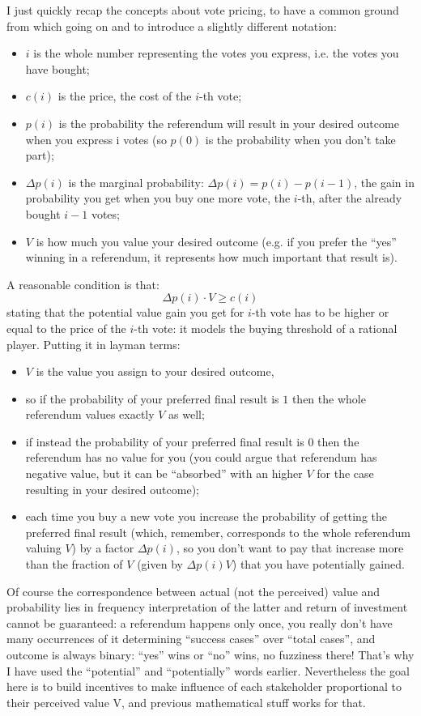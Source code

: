 \documentclass[10pt,a4paper]{article}
\begin{document}
	I just quickly recap the concepts about vote pricing, to have a common ground from which going on and to introduce a slightly different notation:
	\begin{itemize}
		\item $i$ is the whole number representing the votes you express, i.e. the votes you have bought;
		\item $c(i)$ is the price, the cost of the $i$-th vote;
		\item $p(i)$ is the probability the referendum will result in your desired outcome when you express i votes (so $p(0)$ is the probability when you don’t take part);
		\item $\Delta p(i)$ is the marginal probability: $\Delta p(i)=p(i)-p(i-1)$, the gain in probability you get when you buy one more vote, the $i$-th, after the already bought $i-1$ votes;
		\item$V$ is how much you value your desired outcome (e.g. if you prefer the \enquote{yes} winning in a referendum, it represents how much important that result is).
	\end{itemize}
	A reasonable condition is that:
	\begin{equation}\label{eq:1}
		\Delta p(i) \cdot V \geq c(i)
	\end{equation}
	stating that the potential value gain you get for $i$-th vote has to be higher or equal to the price of the $i$-th vote: it models the buying threshold of a rational player. Putting it in layman terms:
	\begin{itemize}
		\item $V$ is the value you assign to your desired outcome,
		\item so if the probability of your preferred final result is $1$ then the whole
		referendum values exactly $V$ as well;
		\item if instead the probability of your preferred final result is $0$ then the referendum has no value for you (you could argue that referendum has negative value, but it can be \enquote{absorbed} with an higher $V$ for the case resulting in your desired outcome);
		\item each time you buy a new vote you increase the probability of getting the preferred final result (which, remember, corresponds to the whole referendum valuing $V$) by a factor $\Delta p(i)$, so you don’t want to pay that increase more than the fraction of $V$ (given by $\Delta p(i)V$) that you have potentially gained.
	\end{itemize}
	Of course the correspondence between actual (not the perceived) value and probability lies in frequency interpretation of the latter and return of investment cannot be guaranteed: a referendum happens only once, you really don’t have many occurrences of it determining \enquote{success cases} over \enquote{total cases}, and outcome is always binary: \enquote{yes} wins or \enquote{no} wins, no fuzziness there! That’s why I have used the \enquote{potential} and \enquote{potentially} words earlier. Nevertheless the goal here is to build incentives to make influence of each stakeholder proportional to their perceived value V, and previous mathematical stuff works for that.
	
\end{document}
